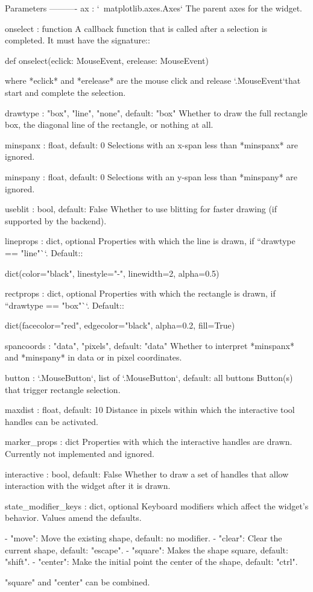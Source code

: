 \begin{DoxyVerb}Parameters
----------
ax : `~matplotlib.axes.Axes`
    The parent axes for the widget.

onselect : function
    A callback function that is called after a selection is completed.
    It must have the signature::

def onselect(eclick: MouseEvent, erelease: MouseEvent)

    where *eclick* and *erelease* are the mouse click and release
    `.MouseEvent`\s that start and complete the selection.

drawtype : {"box", "line", "none"}, default: "box"
    Whether to draw the full rectangle box, the diagonal line of the
    rectangle, or nothing at all.

minspanx : float, default: 0
    Selections with an x-span less than *minspanx* are ignored.

minspany : float, default: 0
    Selections with an y-span less than *minspany* are ignored.

useblit : bool, default: False
    Whether to use blitting for faster drawing (if supported by the
    backend).

lineprops : dict, optional
    Properties with which the line is drawn, if ``drawtype == "line"``.
    Default::

dict(color="black", linestyle="-", linewidth=2, alpha=0.5)

rectprops : dict, optional
    Properties with which the rectangle is drawn, if ``drawtype ==
    "box"``.  Default::

dict(facecolor="red", edgecolor="black", alpha=0.2, fill=True)

spancoords : {"data", "pixels"}, default: "data"
    Whether to interpret *minspanx* and *minspany* in data or in pixel
    coordinates.

button : `.MouseButton`, list of `.MouseButton`, default: all buttons
    Button(s) that trigger rectangle selection.

maxdist : float, default: 10
    Distance in pixels within which the interactive tool handles can be
    activated.

marker_props : dict
    Properties with which the interactive handles are drawn.  Currently
    not implemented and ignored.

interactive : bool, default: False
    Whether to draw a set of handles that allow interaction with the
    widget after it is drawn.

state_modifier_keys : dict, optional
    Keyboard modifiers which affect the widget's behavior.  Values
    amend the defaults.

    - "move": Move the existing shape, default: no modifier.
    - "clear": Clear the current shape, default: "escape".
    - "square": Makes the shape square, default: "shift".
    - "center": Make the initial point the center of the shape,
      default: "ctrl".

    "square" and "center" can be combined.
\end{DoxyVerb}
 

